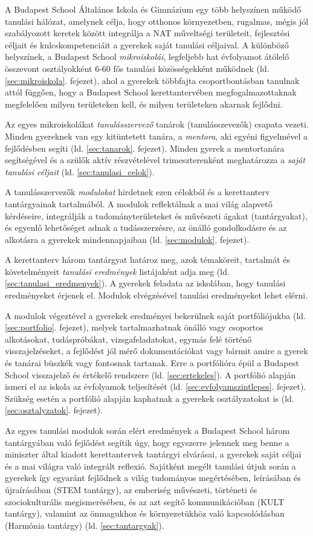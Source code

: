 A Budapest School Általános Iskola és Gimnázium egy több helyszínen működő
tanulási hálózat, amelynek célja, hogy otthonos környezetben, rugalmas, mégis
jól szabályozott keretek között integrálja a NAT
műveltségi
területeit, fejlesztési céljait és kulcskompetenciáit a gyerekek saját tanulási
céljaival. A különböző helyszínek, a Budapest
School \emph{mikroiskolái}, legfeljebb hat évfolyamot átölelő összevont
osztályokként
6-60 fős tanulási közösségekként működnek (ld. \ref{sec:mikroiskola}. fejezet),
ahol a gyerekek többfajta
csoportbontásban tanulnak attól függően, hogy a Budapest School
kerettantervében megfogalmazottaknak megfelelően milyen területeken kell, és
milyen területeken akarnak fejlődni.

Az egyes mikroiskolákat \emph{tanulásszervező} tanárok (tanulásszevezők)
csapata
vezeti.
Minden gyereknek van egy kitüntetett tanára, a \emph{mentora},
aki egyéni figyelmével a fejlődésben segíti
(ld. \ref{sec:tanarok}. fejezet).
Minden gyerek a mentortanára segítségével és a szülők aktív
részvételével trimeszterenként meghatározza a \emph{saját tanulási céljait}
(ld.
\ref{sec:tanulasi_celok}).

A tanulásszervezők \emph{modulokat} hirdetnek ezen célokból és a kerettanterv
tantárgyainak tartalmából. A modulok reflektálnak a
mai világ alapvető kérdéseire,
integrálják	a tudományterületeket és művészeti ágakat (tantárgyakat),
és egyenlő lehetőséget adnak a tudásszerzésre, az önálló gondolkodásre és az
alkotásra a gyerekek mindennapjaiban (ld. \ref{sec:modulok}. fejezet).

A kerettanterv három tantárgyat határoz meg, azok
témaköreit, tartalmát és követelményeit \emph{tanulási eredmények}
listájaként adja meg (ld. \ref{sec:tanulasi_eredmenyek}). A gyerekek feladata
az iskolában, hogy tanulási eredményeket
érjenek el. Modulok elvégzésével tanulási eredményeket lehet
elérni.

A modulok végeztével a gyerekek eredményei bekerülnek saját portfóliójukba (ld.
\ref{sec:portfolio}. fejezet),
melyek tartalmazhatnak önálló vagy csoportos alkotásokat, tudáspróbákat,
vizsgafeladatokat,
egymás felé történő visszajelzéseket, a fejlődést jól mérő dokumentációkat vagy
bármit amire a gyerek és tanárai büszkék vagy fontosnak tartanak.
Erre a portfólióra épül a Budapest School visszajelző és értékelő rendszere
(ld. \ref{sec:ertekeles}). A
portfólió alapján ismeri el az iskola az évfolyamok teljesítését (ld.
\ref{sec:evfolyamszintlepes}. fejezet). Szükség
esetén a portfólió alapján kaphatnak a gyerekek osztályzatokat is (ld.
\ref{sec:osztalyzatok}. fejezet).

Az egyes
tanulási modulok során elért eredmények a Budapest School három tantárgyában
való fejlődést segítik úgy, hogy egyszerre jelennek meg benne a miniszter által
kiadott kerettantervek tantárgyi elvárásai, a gyerekek saját céljai és a mai
világra való integrált reflexió. Sajátként megélt tanulási útjuk során a
gyerekek így egyaránt fejlődnek a világ tudományos megértésében, leírásában és
újraírásában (STEM tantárgy), az emberiség művészeti, történeti és
szociokulturális
megismerésében, és az azt segítő kommunikáció\-ban (KULT tantárgy), valamint az
önmagukhoz
és környezetükhöz való kapcsolódásban (Harmónia tantárgy) (ld.
\ref{sec:tantargyak}).
